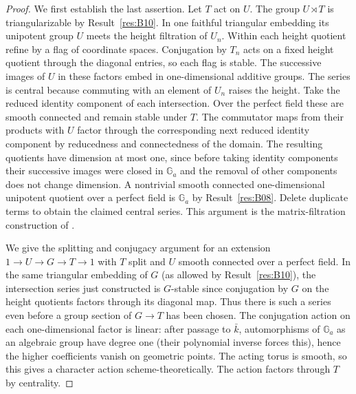 \documentclass[11pt,a4paper,openany,oneside]{book}
\theoremstyle{resultstyle}
\theoremstyle{definition}
\numberwithin{equation}{chapter}
\begin{document}
\begin{proof}
We first establish the last assertion. Let \(T\) act on \(U\).
The group \(U\rtimes T\) is triangularizable by
Result~\ref{res:B10}. In one faithful triangular embedding its
unipotent group \(U\) meets the height filtration of \(U_n\).
Within each height quotient refine by a flag of coordinate spaces.
Conjugation by \(T_n\) acts on a fixed height quotient through the
diagonal entries, so each flag is stable. The successive images
of \(U\) in these factors embed in one-dimensional additive groups.
The series is central because commuting with an element of \(U_n\)
raises the height. Take the reduced identity component of each
intersection. Over the perfect field these are smooth connected
and remain stable under \(T\). The commutator maps from their
products with \(U\) factor through the corresponding next reduced
identity component by reducedness and connectedness of the domain.
The resulting quotients have dimension at most one, since before
taking identity components their successive images were closed
in \(\mathbb G_a\) and the removal of other components does not
change dimension. A nontrivial smooth connected one-dimensional
unipotent quotient over a perfect field is \(\mathbb G_a\) by
Result~\ref{res:B08}. Delete duplicate terms to obtain the claimed
central series. This argument is the matrix-filtration construction
of \cite[Theorem 16.21 and Corollaries 16.22--16.24]{milne}.

We give the splitting and conjugacy argument for an extension
\(1\to U\to G\to T\to1\) with \(T\) split and \(U\) smooth connected
over a perfect field. In the same triangular embedding of \(G\)
(as allowed by Result~\ref{res:B10}), the intersection series just
constructed is \(G\)-stable since conjugation by \(G\) on the height
quotients factors through its diagonal map. Thus there is such a
series even before a group section of \(G\to T\) has been chosen.
The conjugation action on each one-dimensional factor is linear:
after passage to \(\bar k\), automorphisms of \(\mathbb G_a\) as an
algebraic group have degree one (their polynomial inverse forces
this), hence the higher coefficients vanish on geometric points.
The acting torus is smooth, so this gives a character action
scheme-theoretically. The action factors through \(T\) by centrality.


\end{proof}
\end{document}
